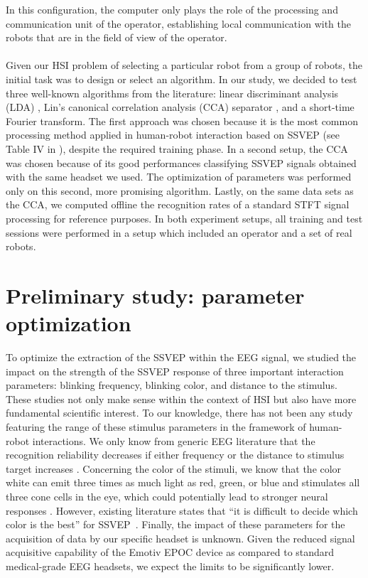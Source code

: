 \documentclass[smallextended]{svjour3}
\begin{document}
In this configuration, the computer only plays the role of the processing and communication unit of the operator, establishing local communication with the robots that are in the field of view of the operator.\\
\\
Given our HSI problem of selecting a particular robot from a group of robots, the initial task was to design or select an algorithm. 
In our study, we decided to test three well-known algorithms from the literature: linear discriminant analysis (LDA) \cite{openvibeSSVEP}, Lin's canonical correlation analysis (CCA) separator \cite{Lin2014},
and a short-time Fourier transform. The first approach was chosen because it is the most common processing method applied in human-robot interaction based on SSVEP (see Table IV in \cite{Bi2013}), despite the required training phase.
In a second setup, the CCA was chosen because of its good performances classifying SSVEP signals obtained with the same headset we used. The optimization of parameters was performed only on this second, more promising algorithm.
Lastly, on the same data sets as the CCA, we computed offline the recognition rates of a standard STFT signal processing for reference purposes.
In both experiment setups, all training and test sessions were performed in a setup which included an operator and a set of real robots.\\

\section{Preliminary study: parameter optimization}
\label{sec:prestudy}

To optimize the extraction of the SSVEP within the EEG signal, we studied the impact on the strength of the SSVEP response of three important interaction parameters: blinking frequency, blinking color, and distance to the stimulus. 
These studies not only make sense within the context of HSI but also have more fundamental scientific interest. 
To our knowledge, there has not been any study featuring the range of these stimulus parameters in the framework of human-robot interactions. We only know from generic EEG literature that the recognition reliability decreases if either frequency or the distance to stimulus target increases \cite{herrmann2001,wu2013effect}. 
Concerning the color of the stimuli, we know that the color white can emit three times as much light as red, green, or blue and stimulates all three cone cells in the eye, which could potentially lead to stronger neural responses \cite{aljshamee2016discriminate,cao2012flashing}. 
However, existing literature states that ``it is difficult to decide which color is the best'' for SSVEP~\cite{Zhu2010}.
Finally, the impact of these parameters for the acquisition of data by our specific headset is unknown. 
Given the reduced signal acquisitive capability of the Emotiv EPOC device as compared to standard medical-grade EEG headsets, we expect the limits to be significantly lower.\\
\end{document}
